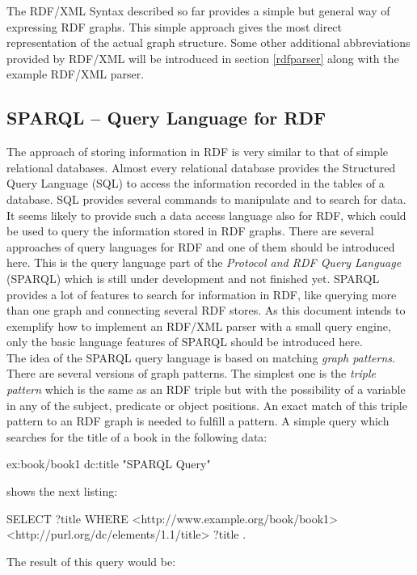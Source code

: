 \documentclass[11pt,a4paper,headsepline, bibtotoc]{scrreprt}
\begin{document}
The RDF/XML Syntax described so far provides a simple but general way of expressing RDF graphs. This simple approach gives the most direct representation of the actual graph structure. Some other additional abbreviations provided by RDF/XML will be introduced in section \ref{rdfparser} along with the example RDF/XML parser. 

\subsection{SPARQL -- Query Language for RDF} \label{sparql}
The approach of storing information in RDF is very similar to that of simple relational databases. Almost every relational database provides the Structured Query Language (SQL) to access the information recorded in the tables of a database. SQL provides several commands to manipulate and to search for data. It seems likely to provide such a data access language also for RDF, which could be used to query the information stored in RDF graphs. There are several approaches of query languages for RDF and one of them should be introduced here. This is the query language part of the \textit{Protocol and RDF Query Language} (SPARQL) \cite{SPARQL} which is still under development and not finished yet. SPARQL provides a lot of features to search for information in RDF, like querying more than one graph and connecting several RDF stores. As this document intends to exemplify how to implement an RDF/XML parser with a small query engine, only the basic language features of SPARQL should be introduced here.\\
The idea of the SPARQL query language is based on matching \textit{graph patterns}. There are several versions of graph patterns. The simplest one is the \textit{triple pattern} which is the same as an RDF triple but with the possibility of a variable in any of the subject, predicate or object positions. An exact match of this triple pattern to an RDF graph is needed to fulfill a pattern. A simple query which searches for the title of a book in the following data:
\begin{blank}
ex:book/book1 dc:title "SPARQL Query"
\end{blank}
shows the next listing:
\begin{blank}[caption=Simple SPARQL Query]
SELECT ?title
WHERE { <http://www.example.org/book/book1> 
        <http://purl.org/dc/elements/1.1/title> 
        ?title . }
\end{blank}
The result of this query would be:\\ \\
\end{document}
